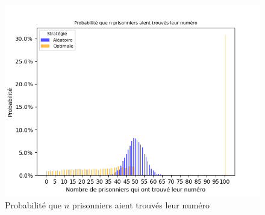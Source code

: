\begin{figure}[h]
  \includegraphics[width=\linewidth]{./strategies_outcomes.png}
  \caption{Probabilité que $n$ prisonniers aient trouvés leur numéro}
  \label{fig:strategies_outcomes}
\end{figure}